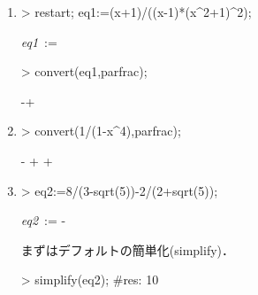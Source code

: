 \begin{enumerate}
\item
\begin{MapleInput}
> restart; eq1:=(x+1)/((x-1)*(x^2+1)^2);
\end{MapleInput}
\begin{MapleOutput}
{\it eq1}\, := \,{}
\end{MapleOutput}

\begin{MapleInput}
> convert(eq1,parfrac);
\end{MapleInput}
\begin{MapleOutput}
-{}+\,{}
\end{MapleOutput}

\item
\begin{MapleInput}
> convert(1/(1-x^4),parfrac);
\end{MapleInput}
\begin{MapleOutput}
- + + 
\end{MapleOutput}

\item
\begin{MapleInput}
> eq2:=8/(3-sqrt(5))-2/(2+sqrt(5));
\end{MapleInput}
\begin{MapleOutput}
{\it eq2}\, := -
\end{MapleOutput}
まずはデフォルトの簡単化(simplify)．
\begin{MapleInput}
> simplify(eq2); #res: 10
\end{MapleInput}


\end{enumerate}

